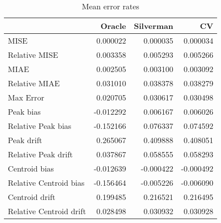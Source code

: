 \begin{table}[H]
\centering
\begin{tabular}{lrrr}
  \hline
 & Oracle & Silverman & CV \\ 
  \hline
MISE & 0.000022 & 0.000035 & 0.000034 \\ 
  Relative MISE & 0.003358 & 0.005293 & 0.005266 \\ 
  MIAE & 0.002505 & 0.003100 & 0.003092 \\ 
  Relative MIAE & 0.031010 & 0.038378 & 0.038279 \\ 
  Max Error & 0.020705 & 0.030617 & 0.030498 \\ 
  Peak bias & -0.012292 & 0.006167 & 0.006026 \\ 
  Relative Peak bias & -0.152166 & 0.076337 & 0.074592 \\ 
  Peak drift & 0.265067 & 0.409888 & 0.408051 \\ 
  Relative Peak drift & 0.037867 & 0.058555 & 0.058293 \\ 
  Centroid bias & -0.012639 & -0.000422 & -0.000492 \\ 
  Relative Centroid bias & -0.156464 & -0.005226 & -0.006090 \\ 
  Centroid drift & 0.199485 & 0.216521 & 0.216495 \\ 
  Relative Centroid drift & 0.028498 & 0.030932 & 0.030928 \\ 
   \hline
\end{tabular}
\caption{Mean error rates} 
\label{tbl:mean_error_rates}
\end{table}

